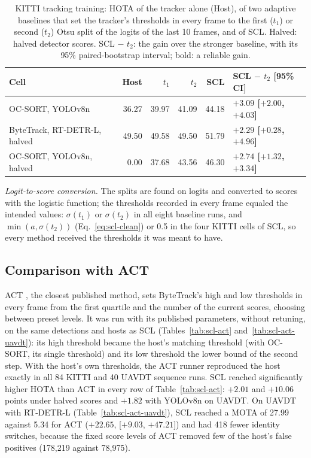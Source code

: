 \begin{table}[tbp]
\centering
\caption{KITTI tracking training: HOTA of the tracker alone (Host), of two adaptive baselines that set the tracker's thresholds in every frame to the first ($t_1$) or second ($t_2$) Otsu split of the logits of the last 10 frames, and of SCL. Halved: halved detector scores. SCL $-$ $t_2$: the gain over the stronger baseline, with its 95\% paired-bootstrap interval; bold: a reliable gain.}
\label{tab:scl-baselines}
\small\setlength{\tabcolsep}{4pt}
\begin{tabular}{lrrrrl}
\toprule
Cell & Host & $t_1$ & $t_2$ & SCL & SCL $-$ $t_2$ [95\% CI]\\
\midrule
OC-SORT, YOLOv8n & 36.27 & 39.97 & 41.09 & 44.18 & \textbf{$+3.09$ [$+2.00$, $+4.03$]}\\
ByteTrack, RT-DETR-L, halved & 49.50 & 49.58 & 49.50 & 51.79 & \textbf{$+2.29$ [$+0.28$, $+4.96$]}\\
OC-SORT, YOLOv8n, halved & 0.00 & 37.68 & 43.56 & 46.30 & \textbf{$+2.74$ [$+1.32$, $+3.34$]}\\
\bottomrule
\end{tabular}
\end{table}

\emph{Logit-to-score conversion.} The splits are found on logits and converted to scores with the logistic function; the thresholds recorded in every frame equaled the intended values: $\sigma(t_1)$ or $\sigma(t_2)$ in all eight baseline runs, and $\min(a,\sigma(t_2))$ (Eq.~\eqref{eq:scl-clean}) or 0.5 in the four KITTI cells of SCL, so every method received the thresholds it was meant to have.

\subsection{Comparison with ACT}\label{sec:scl-act}
ACT \cite{act2026adaptive}, the closest published method, sets ByteTrack's high and low thresholds in every frame from the first quartile and the number of the current scores, choosing between preset levels. It was run with its published parameters, without retuning, on the same detections and hosts as SCL (Tables~\ref{tab:scl-act} and~\ref{tab:scl-act-uavdt}): its high threshold became the host's matching threshold (with OC-SORT, its single threshold) and its low threshold the lower bound of the second step. With the host's own thresholds, the ACT runner reproduced the host exactly in all 84 KITTI and 40 UAVDT sequence runs. SCL reached significantly higher HOTA than ACT in every row of Table~\ref{tab:scl-act}: $+2.01$ and $+10.06$ points under halved scores and $+1.82$ with YOLOv8n on UAVDT. On UAVDT with RT-DETR-L (Table~\ref{tab:scl-act-uavdt}), SCL reached a MOTA of 27.99 against 5.34 for ACT ($+22.65$, [$+9.03$, $+47.21$]) and had 418 fewer identity switches, because the fixed score levels of ACT removed few of the host's false positives (178,219 against 78,975).

